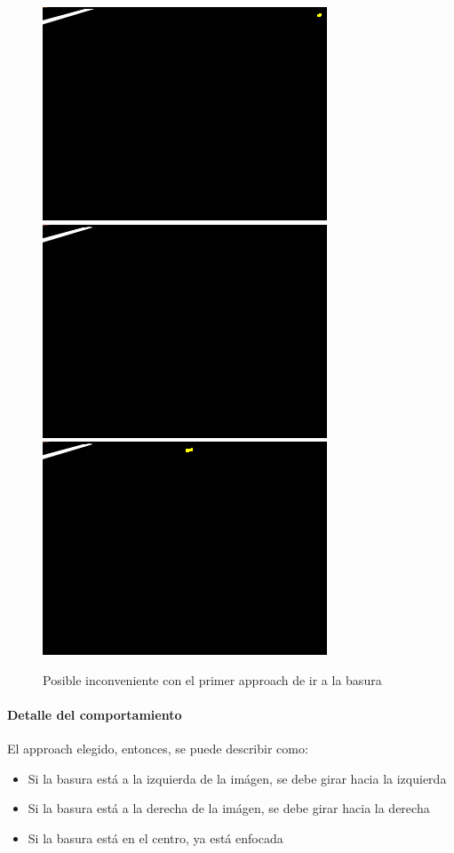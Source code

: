 \begin{figure}[htp]
\begin{center}
\includegraphics[scale=0.3]{comportamientos/esquina.png}
\includegraphics[scale=0.3]{comportamientos/frentemuylejos.png}
\includegraphics[scale=0.3]{comportamientos/frentelejos.png}
\caption{Posible inconveniente con el primer approach de ir a la basura}
\label{fig:papproachgotoproblem}
\end{center}
\end{figure}

\paragraph{Detalle del comportamiento}
El approach elegido, entonces, se puede describir como:
\begin{itemize}
\item Si la basura est\'a a la izquierda de la im\'agen, se debe girar hacia la izquierda
\item Si la basura est\'a a la derecha de la im\'agen, se debe girar hacia la derecha
\item Si la basura est\'a en el centro, ya est\'a enfocada
\end{itemize}

